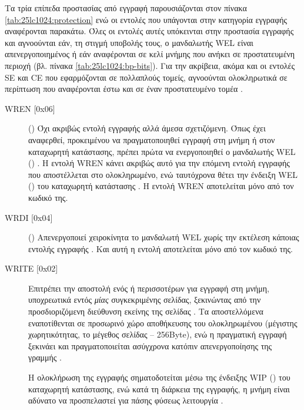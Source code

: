 Τα τρία επίπεδα προστασίας από εγγραφή παρουσιάζονται στον πίνακα
\ref{tab:25lc1024:protection} ενώ οι εντολές που υπάγονται στην κατηγορία
εγγραφής αναφέρονται παρακάτω. Όλες οι εντολές αυτές υπόκεινται στην προστασία
εγγραφής και αγνοούνται εάν, τη στιγμή υποβολής τους, ο μανδαλωτής WEL είναι
απενεργοποιημένος ή εάν αναφέρονται σε κελί μνήμης που ανήκει σε προστατευμένη
περιοχή (βλ. πίνακα \ref{tab:25lc1024:bp-bits}). Για την ακρίβεια, ακόμα και οι
εντολές SE και CE που εφαρμόζονται σε πολλαπλούς τομείς, αγνοούνται ολοκληρωτικά
σε περίπτωση που αναφέρονται έστω και σε έναν προστατευμένο τομέα
\parencite[14--15]{25lc1024}.

\begin{description}
    \item[WREN [0x06{]}] () Όχι ακριβώς εντολή εγγραφής αλλά
    άμεσα σχετιζόμενη. Όπως έχει αναφερθεί, προκειμένου να πραγματοποιηθεί
    εγγραφή στη μνήμη ή στον καταχωρητή κατάστασης, πρέπει πρώτα να
    ενεργοποιηθεί ο μανδαλωτής WEL ()
    \parencite[6]{25lc1024}.
    Η εντολή WREN κάνει ακριβώς αυτό για την επόμενη εντολή εγγραφής που
    αποστέλλεται στο ολοκληρωμένο, ενώ ταυτόχρονα θέτει την ένδειξη WEL
    () του καταχωρητή κατάστασης
    \parencite[10]{25lc1024}. Η εντολή WREN αποτελείται μόνο από τον κωδικό της.

    \item[WRDI [0x04{]}] () Απενεργοποιεί χειροκίνητα το
    μανδαλωτή WEL χωρίς την εκτέλεση κάποιας εντολής εγγραφής
    \parencite[9]{25lc1024}. Και αυτή η εντολή αποτελείται μόνο από τον κωδικό
    της.

    \item[WRITE [0x02{]}] Επιτρέπει την αποστολή ενός ή περισσοτέρων 
    για εγγραφή στη μνήμη, υποχρεωτικά εντός \emph{μίας} συγκεκριμένης σελίδας,
    ξεκινώντας από την προσδιοριζόμενη διεύθυνση εκείνης της σελίδας
    \parencite[6,8]{25lc1024}. Τα αποστελλόμενα  εναποτίθενται σε
    προσωρινό χώρο αποθήκευσης του ολοκληρωμένου (μέγιστης χωρητικότητας, το
    μέγεθος σελίδας -- 256Byte), ενώ η πραγματική εγγραφή ξεκινάει και
    πραγματοποιείται ασύγχρονα κατόπιν απενεργοποίησης της γραμμής
     \parencite[6]{25lc1024}.

    Η ολοκλήρωση της εγγραφής σηματοδοτείται μέσω της ένδειξης WIP
    () του καταχωρητή κατάστασης, ενώ κατά τη διάρκεια της
    εγγραφής, η μνήμη είναι αδύνατο να προσπελαστεί για πάσης φύσεως λειτουργία
    \parencite[6]{25lc1024}.


\end{description}
